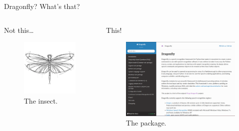 \documentclass[english]{beamer}
\begin{document}
\begin{frame}{Dragonfly? What's that?}
    \begin{columns}[T]
        \begin{column}{.5\textwidth}
            Not this\dots
            \begin{figure}
                \centering
                \includegraphics[height=.65\textwidth]{images/dragonfly.png}
                \caption{The insect.}
            \end{figure}
        \end{column}
        \begin{column}{.5\textwidth}
            This!
            \begin{figure}
                \centering
                \includegraphics[height=.7\textwidth]{images/dragonfly_python.png}
                \caption{The package.}
            \end{figure}
        \end{column}
    \end{columns}
\end{frame}
\end{document}
